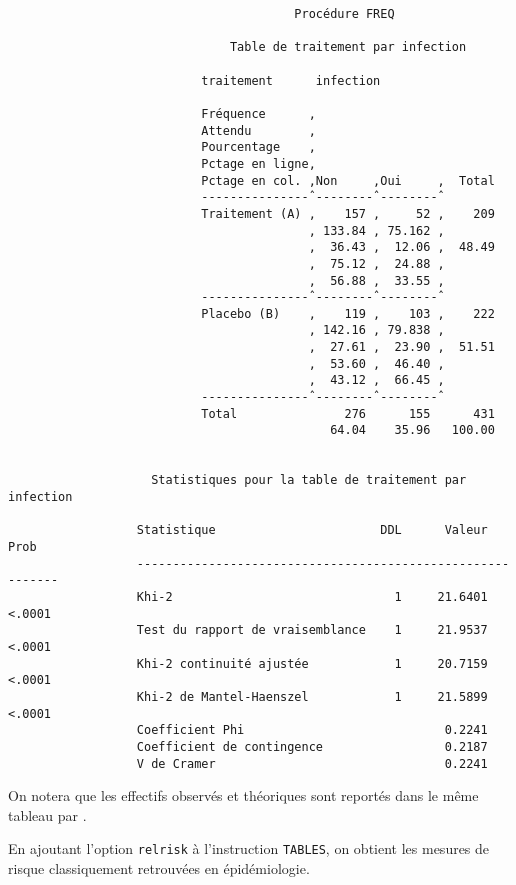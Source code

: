 \begin{verbatim}
                                        Procédure FREQ

                               Table de traitement par infection

                           traitement      infection

                           Fréquence      ‚
                           Attendu        ‚
                           Pourcentage    ‚
                           Pctage en ligne‚
                           Pctage en col. ‚Non     ‚Oui     ‚  Total
                           ---------------ˆ--------ˆ--------ˆ
                           Traitement (A) ‚    157 ‚     52 ‚    209
                                          ‚ 133.84 ‚ 75.162 ‚
                                          ‚  36.43 ‚  12.06 ‚  48.49
                                          ‚  75.12 ‚  24.88 ‚
                                          ‚  56.88 ‚  33.55 ‚
                           ---------------ˆ--------ˆ--------ˆ
                           Placebo (B)    ‚    119 ‚    103 ‚    222
                                          ‚ 142.16 ‚ 79.838 ‚
                                          ‚  27.61 ‚  23.90 ‚  51.51
                                          ‚  53.60 ‚  46.40 ‚
                                          ‚  43.12 ‚  66.45 ‚
                           ---------------ˆ--------ˆ--------ˆ
                           Total               276      155      431
                                             64.04    35.96   100.00


                    Statistiques pour la table de traitement par infection

                  Statistique                       DDL      Valeur      Prob
                  -----------------------------------------------------------
                  Khi-2                               1     21.6401    <.0001
                  Test du rapport de vraisemblance    1     21.9537    <.0001
                  Khi-2 continuité ajustée            1     20.7159    <.0001
                  Khi-2 de Mantel-Haenszel            1     21.5899    <.0001
                  Coefficient Phi                            0.2241
                  Coefficient de contingence                 0.2187
                  V de Cramer                                0.2241
\end{verbatim}
On notera que les effectifs observés et théoriques sont reportés dans le
même tableau par \SAS.

En ajoutant l'option \texttt{relrisk} à l'instruction \texttt{TABLES}, on
obtient les mesures de risque classiquement retrouvées en épidémiologie.

